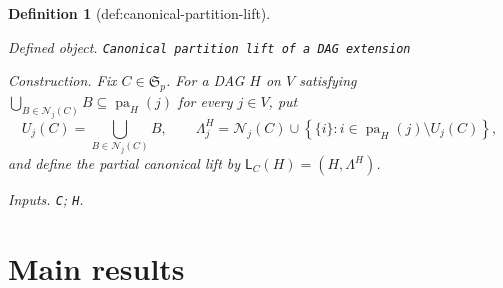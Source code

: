 \documentclass{article}
\newtheorem{definition}{Definition}
\begin{document}
\begin{definition}[def:canonical-partition-lift]\label{def:canonical-partition-lift}
\par\smallskip\noindent\emph{Defined object.} \texttt{Canonical partition lift of a DAG extension}
\par\smallskip\noindent\emph{Construction.} Fix \(C\in\mathfrak S_p\). For a DAG \(H\) on \(V\) satisfying \(\bigcup_{B\in\mathcal N_j(C)}B\subseteq\operatorname{pa}_H(j)\) for every \(j\in V\), put
\[
 U_j(C)=\bigcup_{B\in\mathcal N_j(C)}B,
 \qquad
 \Lambda^H_j=\mathcal N_j(C)\cup
 \left\{\{i\}:i\in\operatorname{pa}_H(j)\setminus U_j(C)\right\},
\]
and define the partial canonical lift by \(\mathsf L_C(H)=(H,\Lambda^H)\).
\par\smallskip\noindent\emph{Inputs.} \texttt{C}; \texttt{H}.
\end{definition}

\section{Main results}
\end{document}
